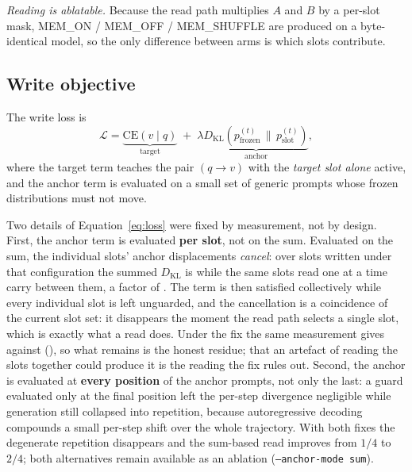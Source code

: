 \documentclass[11pt]{article}
\begin{document}
\emph{Reading is ablatable.} Because the read path multiplies $A$ and $B$ by a
per-slot mask, MEM\_ON / MEM\_OFF / MEM\_SHUFFLE are produced on a byte-identical model, so the only difference between arms is which slots contribute.

\subsection{Write objective}

The write loss is
\begin{equation}
\mathcal{L} = \underbrace{\mathrm{CE}(v \mid q)}_{\text{target}}
\; + \; \lambda \underbrace{D_{\mathrm{KL}}\!\left(p_{\text{frozen}}^{(t)} \,\|\, p_{\text{slot}}^{(t)}\right)}_{\text{anchor}},
\label{eq:loss}
\end{equation}
where the target term teaches the pair $(q \to v)$ with the \emph{target slot
alone} active, and the anchor term is evaluated on a small set of generic prompts
whose frozen distributions must not move.

Two details of Equation~\ref{eq:loss} were fixed by measurement, not by design.
First, the anchor term is evaluated \textbf{per slot}, not on the sum. Evaluated on
the sum, the individual slots' anchor displacements \emph{cancel}: over \tAnchorItems{}
slots written under that configuration the summed $D_{\mathrm{KL}}$ is
\tAnchorLegacySumKL{} while the same slots read one at a time carry
\tAnchorLegacySlotTotal{} between them, a factor of \tAnchorLegacyFactor{}. The term is
then satisfied collectively while every individual slot is left unguarded, and the
cancellation is a coincidence of the current slot set: it disappears the moment the read
path selects a single slot, which is exactly what a read does. Under the fix the same
measurement gives \tAnchorSumKL{} against \tAnchorSlotTotal{} (\tAnchorFactor{}), so what
remains is the honest residue; that an artefact of reading the slots together could
produce it is the reading the fix rules out.
Second,
the anchor is evaluated at \textbf{every position} of the anchor prompts, not only
the last: a guard evaluated only at the final position left the per-step divergence
negligible while generation still collapsed into repetition, because autoregressive
decoding compounds a small per-step shift over the whole trajectory. With both fixes the
degenerate repetition disappears and the sum-based read improves from $1/4$ to
$2/4$; both alternatives remain available as an ablation
(\texttt{--anchor-mode sum}).
\end{document}
